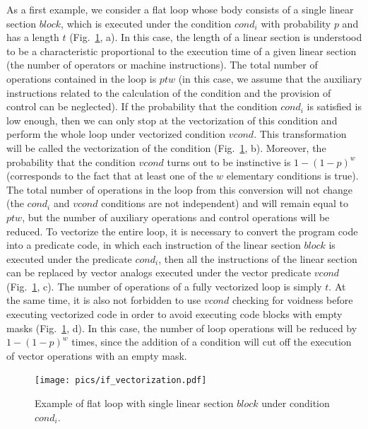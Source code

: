 \documentclass[
11pt,%
tightenlines,%
twoside,%
onecolumn,%
nofloats,%
nobibnotes,%
nofootinbib,%
superscriptaddress,%
noshowpacs,%
centertags]%
{revtex4}
\begin{document}
As a first example, we consider a flat loop whose body consists of a single linear section $block$, which is executed under the condition $cond_i$ with probability $p$ and has a length $t$ (Fig.~\ref{fig:flat_loop_1}, a).
In this case, the length of a linear section is understood to be a characteristic proportional to the execution time of a given linear section (the number of operators or machine instructions).
The total number of operations contained in the loop is $ptw$ (in this case, we assume that the auxiliary instructions related to the calculation of the condition and the provision of control can be neglected).
If the probability that the condition $cond_i$ is satisfied is low enough, then we can only stop at the vectorization of this condition and perform the whole loop under vectorized condition $vcond$.
This transformation will be called the vectorization of the condition (Fig.~\ref{fig:flat_loop_1}, b).
Moreover, the probability that the condition $vcond$ turns out to be instinctive is $1 - (1 - p) ^ w$ (corresponds to the fact that at least one of the $w$ elementary conditions is true).
The total number of operations in the loop from this conversion will not change (the $cond_i$ and $vcond$ conditions are not independent) and will remain equal to $ptw$, but the number of auxiliary operations and control operations will be reduced.
To vectorize the entire loop, it is necessary to convert the program code into a predicate code, in which each instruction of the linear section $block$ is executed under the predicate $cond_i$, then all the instructions of the linear section can be replaced by vector analogs executed under the vector predicate $vcond$ (Fig.~\ref{fig:flat_loop_1}, c).
The number of operations of a fully vectorized loop is simply $t$.
At the same time, it is also not forbidden to use $vcond$ checking for voidness before executing vectorized code in order to avoid executing code blocks with empty masks (Fig.~\ref{fig:flat_loop_1}, d).
In this case, the number of loop operations will be reduced by $1 - (1 - p) ^ w$ times, since the addition of a condition will cut off the execution of vector operations with an empty mask.

\begin{figure}[h]
\setcaptionmargin{5mm}
\onelinecaptionstrue
\texttt{[image: pics/if\_vectorization.pdf]}
\caption{Example of flat loop with single linear section $block$ under condition $cond_i$.}
\label{fig:flat_loop_1}
\end{figure}
\end{document}
